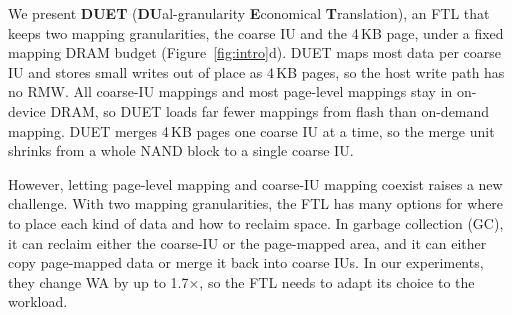 We present \textbf{DUET} (\textbf{DU}al-granularity \textbf{E}conomical
\textbf{T}ranslation), an FTL that keeps two mapping granularities, the coarse IU
and the 4\,KB page, under a fixed mapping DRAM budget (Figure~\ref{fig:intro}d). DUET maps most data
per coarse IU and stores small writes out of place as 4\,KB pages, so the host write
path has no RMW. All coarse-IU mappings and most page-level mappings stay in
on-device DRAM, so DUET loads far fewer mappings from flash than on-demand mapping.
DUET merges 4\,KB pages one coarse IU at a time, so the merge unit shrinks from
a whole NAND block to a single coarse IU.

However, letting page-level mapping and coarse-IU mapping coexist raises a new challenge.
With two mapping granularities, the FTL has many options for where to place each kind of data and
how to reclaim space. In garbage collection (GC), it can reclaim either the coarse-IU or the page-mapped area, and it can either copy
page-mapped data or merge it back into coarse IUs. In our experiments, they change WA by up to 1.7$\times$,
so the FTL needs to adapt its choice to the workload.

